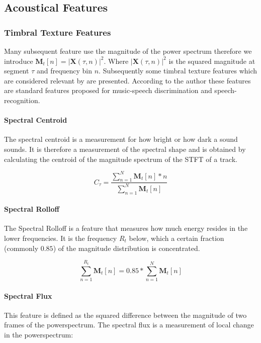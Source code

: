 \documentclass[cic,tc,english]{iiufrgs}
\begin{document}
\subsection{Acoustical Features}
\subsubsection{Timbral Texture Features}
Many subsequent feature use the magnitude of the power spectrum therefore we introduce $\bm{M}_{t}[n] = \vert \mathbf{X}(\tau,n) \vert^2$. Where $\vert \mathbf{X}(\tau,n) \vert^2$ is the squared magnitude at segment $\tau$ and frequency bin $n$. Subsequently some timbral texture features which are considered relevant by \cite{tzanetakis2002musical} are presented. According to the author these features are standard features proposed for music-speech discrimination and speech-recognition.

\paragraph{Spectral Centroid}
The spectral centroid is a measurement for how bright or how dark a sound sounds. It is therefore a measurement of the spectral shape and is obtained by calculating the centroid of the magnitude spectrum of the STFT of a track.

\begin{equation}
C_{\tau} = \frac{\sum^{N}_{n=1}\bm{M}_{t}[n] * n}{\sum^{N}_{n=1}\bm{M}_{t}[n]}
\end{equation}

\paragraph{Spectral Rolloff}
The Spectral Rolloff is a feature that measures how much energy resides in the lower frequencies. It is the frequency $R_{t}$ below, which a certain fraction (commonly $0.85$) of the magnitude distribution is concentrated.

\begin{equation}
 \sum_{n=1}^{R_{t}}\bm{M}_{t}[n]  = 0.85 * \sum_{n=1}^{N}\bm{M}_{t}[n] 
\end{equation}

\paragraph{Spectral Flux} This feature is defined as the squared difference between the magnitude of two frames of the powerspectrum. The spectral flux is a measurement of local change in the powerspectrum:
\end{document}
